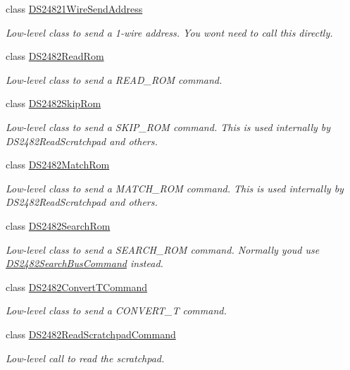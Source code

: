 \begin{DoxyCompactItemize}
class \mbox{\hyperlink{class_d_s24821_wire_send_address}{D\+S24821\+Wire\+Send\+Address}}
\begin{DoxyCompactList}\small\item\em Low-\/level class to send a 1-\/wire address. You won\textquotesingle{}t need to call this directly. \end{DoxyCompactList}\item 
class \mbox{\hyperlink{class_d_s2482_read_rom}{D\+S2482\+Read\+Rom}}
\begin{DoxyCompactList}\small\item\em Low-\/level class to send a R\+E\+A\+D\+\_\+\+R\+OM command. \end{DoxyCompactList}\item 
class \mbox{\hyperlink{class_d_s2482_skip_rom}{D\+S2482\+Skip\+Rom}}
\begin{DoxyCompactList}\small\item\em Low-\/level class to send a S\+K\+I\+P\+\_\+\+R\+OM command. This is used internally by D\+S2482\+Read\+Scratchpad and others. \end{DoxyCompactList}\item 
class \mbox{\hyperlink{class_d_s2482_match_rom}{D\+S2482\+Match\+Rom}}
\begin{DoxyCompactList}\small\item\em Low-\/level class to send a M\+A\+T\+C\+H\+\_\+\+R\+OM command. This is used internally by D\+S2482\+Read\+Scratchpad and others. \end{DoxyCompactList}\item 
class \mbox{\hyperlink{class_d_s2482_search_rom}{D\+S2482\+Search\+Rom}}
\begin{DoxyCompactList}\small\item\em Low-\/level class to send a S\+E\+A\+R\+C\+H\+\_\+\+R\+OM command. Normally you\textquotesingle{}d use \mbox{\hyperlink{class_d_s2482_search_bus_command}{D\+S2482\+Search\+Bus\+Command}} instead. \end{DoxyCompactList}\item 
class \mbox{\hyperlink{class_d_s2482_convert_t_command}{D\+S2482\+Convert\+T\+Command}}
\begin{DoxyCompactList}\small\item\em Low-\/level class to send a C\+O\+N\+V\+E\+R\+T\+\_\+T command. \end{DoxyCompactList}\item 
class \mbox{\hyperlink{class_d_s2482_read_scratchpad_command}{D\+S2482\+Read\+Scratchpad\+Command}}
\begin{DoxyCompactList}\small\item\em Low-\/level call to read the scratchpad. \end{DoxyCompactList}\item 

\end{DoxyCompactItemize}
